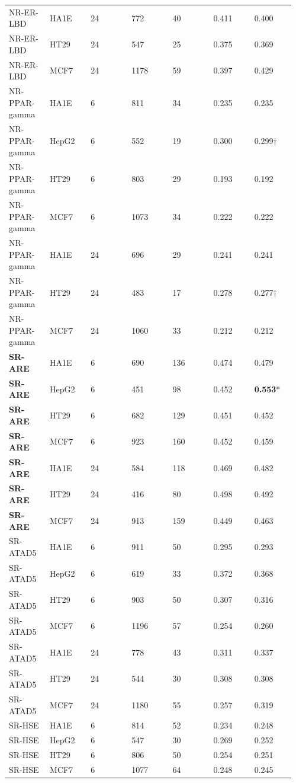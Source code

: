\begin{longtable}{p{0.137\linewidth}p{0.137\linewidth}p{0.137\linewidth}p{0.137\linewidth}p{0.137\linewidth}p{0.137\linewidth}p{0.137\linewidth}}
NR-ER-LBD & HA1E & 24 & 772 & 40 & 0.411 & 0.400 \\
NR-ER-LBD & HT29 & 24 & 547 & 25 & 0.375 & 0.369 \\
NR-ER-LBD & MCF7 & 24 & 1178 & 59 & 0.397 & 0.429 \\
NR-PPAR-gamma & HA1E & 6 & 811 & 34 & 0.235 & 0.235 \\
NR-PPAR-gamma & HepG2 & 6 & 552 & 19 & 0.300 & 0.299† \\
NR-PPAR-gamma & HT29 & 6 & 803 & 29 & 0.193 & 0.192 \\
NR-PPAR-gamma & MCF7 & 6 & 1073 & 34 & 0.222 & 0.222 \\
NR-PPAR-gamma & HA1E & 24 & 696 & 29 & 0.241 & 0.241 \\
NR-PPAR-gamma & HT29 & 24 & 483 & 17 & 0.278 & 0.277† \\
NR-PPAR-gamma & MCF7 & 24 & 1060 & 33 & 0.212 & 0.212 \\
\textbf{SR-ARE} & HA1E & 6 & 690 & 136 & 0.474 & 0.479 \\
\textbf{SR-ARE} & HepG2 & 6 & 451 & 98 & 0.452 & \textbf{0.553}* \\
\textbf{SR-ARE} & HT29 & 6 & 682 & 129 & 0.451 & 0.452 \\
\textbf{SR-ARE} & MCF7 & 6 & 923 & 160 & 0.452 & 0.459 \\
\textbf{SR-ARE} & HA1E & 24 & 584 & 118 & 0.469 & 0.482 \\
\textbf{SR-ARE} & HT29 & 24 & 416 & 80 & 0.498 & 0.492 \\
\textbf{SR-ARE} & MCF7 & 24 & 913 & 159 & 0.449 & 0.463 \\
SR-ATAD5 & HA1E & 6 & 911 & 50 & 0.295 & 0.293 \\
SR-ATAD5 & HepG2 & 6 & 619 & 33 & 0.372 & 0.368 \\
SR-ATAD5 & HT29 & 6 & 903 & 50 & 0.307 & 0.316 \\
SR-ATAD5 & MCF7 & 6 & 1196 & 57 & 0.254 & 0.260 \\
SR-ATAD5 & HA1E & 24 & 778 & 43 & 0.311 & 0.337 \\
SR-ATAD5 & HT29 & 24 & 544 & 30 & 0.308 & 0.308 \\
SR-ATAD5 & MCF7 & 24 & 1180 & 55 & 0.257 & 0.319 \\
SR-HSE & HA1E & 6 & 814 & 52 & 0.234 & 0.248 \\
SR-HSE & HepG2 & 6 & 547 & 30 & 0.269 & 0.252 \\
SR-HSE & HT29 & 6 & 806 & 50 & 0.254 & 0.251 \\
SR-HSE & MCF7 & 6 & 1077 & 64 & 0.248 & 0.245 \\

\end{longtable}
